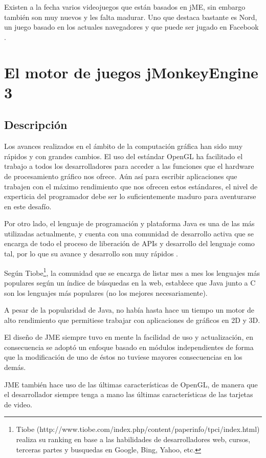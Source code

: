 \documentclass[a4paper,12pt,openany,oneside]{book}
\begin{document}
Existen a la fecha varios videojuegos que están basados en jME, sin embargo también son muy nuevos y les falta madurar. Uno que destaca bastante es Nord, un juego basado en los actuales navegadores y que puede ser jugado en Facebook \cite{JMONKEY}.
\chapter{El motor de juegos jMonkeyEngine 3}
\section{Descripción}
Los avances realizados en el ámbito de la computación gráfica han sido muy rápidos y con grandes cambios. El uso del estándar OpenGL ha facilitado el trabajo a todos los desarrolladores para acceder a las funciones que el hardware de procesamiento gráfico nos ofrece. Aún así para escribir aplicaciones que trabajen con el máximo rendimiento que nos ofrecen estos estándares, el nivel de experticia del programador debe ser lo suficientemente maduro para aventurarse en este desafío.

Por otro lado, el lenguaje de programación y plataforma Java es una de las más utilizadas actualmente, y cuenta con una comunidad de desarrollo activa que se encarga de todo el proceso de liberación de APIs y desarrollo del lenguaje como tal, por lo que su avance y desarrollo son muy rápidos \cite{JAVA}.

Según Tiobe\footnote{Tiobe (http://www.tiobe.com/index.php/content/paperinfo/tpci/index.html) realiza su ranking en base a las habilidades de desarrolladores web, cursos, terceras partes y busquedas en Google, Bing, Yahoo, etc.}, la comunidad que se encarga de listar mes a mes los lenguajes más populares según un índice de búsquedas en la web, establece que Java junto a C son los lenguajes más populares (no los mejores necesariamente).

A pesar de la popularidad de Java, no había hasta hace un tiempo un motor de alto rendimiento que permitiese trabajar con aplicaciones de gráficos en 2D y 3D.

El diseño de JME siempre tuvo en mente la facilidad de uso y actualización, en consecuencia se adoptó un enfoque basado en módulos independientes de forma que la modificación de uno de éstos no tuviese mayores consecuencias en los demás. 

JME también hace uso de las últimas características de OpenGL, de manera que el desarrollador siempre tenga a mano las últimas características de las tarjetas de video.
\end{document}
